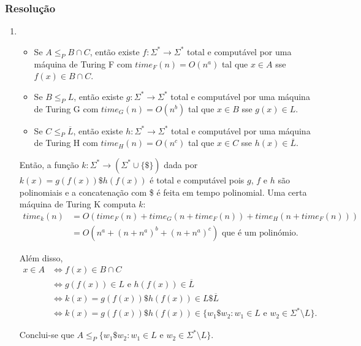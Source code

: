 \documentclass[a4paper,12pt]{article}
\begin{document}
\subsubsection*{Resolução}
\begin{enumerate}[label=\alph*)]
  \item
  \begin{itemize}
      \item Se $ A \leq_P B \cap C $, então existe $ f:\Sigma^* \to \Sigma^* $ total e computável por uma máquina de Turing F com $time_F(n) = O(n^a)$ tal que $x \in A$ sse $f(x) \in B \cap C$.
      
      \vspace{0.3cm}
      \item Se $ B \leq_P L $, então existe $ g:\Sigma^* \to \Sigma^* $ total e computável por uma máquina de Turing G com $time_G(n) = O(n^b)$ tal que $x \in B$ sse $g(x) \in L$.
      
      \vspace{0.3cm}
      \item Se $ C \leq_P \overline{L} $, então existe $ h:\Sigma^* \to \Sigma^* $ total e computável por uma máquina de Turing H com $time_H(n) = O(n^c)$ tal que $x \in C$ sse $h(x) \in \overline{L}$.
  \end{itemize}

  \vspace{0.3cm}
  Então, a função $k:\Sigma^* \to (\Sigma^* \cup \{\$\})$ dada por $k(x) = g(f(x))\$h(f(x))$ é total e computável pois $g$, $f$ e $h$ são polinomiais e a concatenação com \$ é feita em tempo polinomial. Uma certa máquina de Turing K computa $k$:
  \begin{align*}
      time_k(n) &= O(time_F(n) + time_G(n+time_F(n)) + time_H(n+time_F(n))) \\
      &= O(n^a + (n+n^a)^b + (n+n^a)^c) \text{ que é um polinómio. }
  \end{align*}

  Além disso,
  \begin{align*}
      x \in A &\iff f(x) \in B \cap C \\
      &\iff g(f(x)) \in L \text{ e } h(f(x)) \in \overline{L} \\
      &\iff k(x) = g(f(x))\$h(f(x)) \in L\$ \overline{L} \\
      &\iff k(x) = g(f(x))\$h(f(x)) \in \{ w_1\$ w_2 : w_1 \in L \text{ e } w_2 \in \Sigma^* \setminus L \}.
  \end{align*}

  Conclui-se que $A \leq_P \{ w_1\$ w_2 : w_1 \in L \text{ e } w_2 \in \Sigma^* \setminus L \}$.


\end{enumerate}
\end{document}
